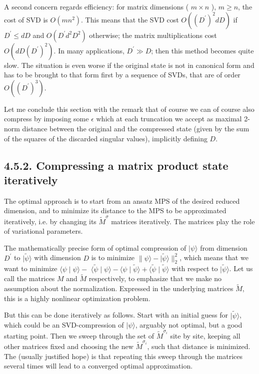 \documentclass[12pt]{article}
\begin{document}
A second concern regards efficiency: for matrix dimensions ( $m \times n$ ), $m \geq n$, the cost of SVD is $O\left(m n^{2}\right)$. This means that the SVD cost $O\left(\left(D^{\prime}\right)^{2} d D\right)$ if $D^{\prime} \leq d D$ and $O\left(D^{\prime} d^{2} D^{2}\right)$ otherwise; the matrix multiplications cost $O\left(d D\left(D^{\prime}\right)^{2}\right)$. In many applications, $D^{\prime} \gg D$; then this method becomes quite slow. The situation is even worse if the original state is not in canonical form and has to be brought to that form first by a sequence of SVDs, that are of order $O\left(\left(D^{\prime}\right)^{3}\right)$.

Let me conclude this section with the remark that of course we can of course also compress by imposing some $\epsilon$ which at each truncation we accept as maximal 2-norm distance between the original and the compressed state (given by the sum of the squares of the discarded singular values), implicitly defining $D$.

\subsection*{4.5.2. Compressing a matrix product state iteratively}
The optimal approach is to start from an ansatz MPS of the desired reduced dimension, and to minimize its distance to the MPS to be approximated iteratively, i.e. by changing its $\tilde{M}^{\sigma}$ matrices iteratively. The matrices play the role of variational parameters.

The mathematically precise form of optimal compression of $|\psi\rangle$ from dimension $D^{\prime}$ to $|\tilde{\psi}\rangle$ with dimension $D$ is to minimize $\| \psi\rangle-|\tilde{\psi}\rangle \|_{2}^{2}$, which means that we want to minimize $\langle\psi \mid \psi\rangle-$ $\langle\tilde{\psi} \mid \psi\rangle-\langle\psi \mid \tilde{\psi}\rangle+\langle\tilde{\psi} \mid \tilde{\psi}\rangle$ with respect to $|\tilde{\psi}\rangle$. Let us call the matrices $M$ and $\tilde{M}$ respectively, to emphasize that we make no assumption about the normalization. Expressed in the underlying matrices $\tilde{M}$, this is a highly nonlinear optimization problem.

But this can be done iteratively as follows. Start with an initial guess for $|\tilde{\psi}\rangle$, which could be an SVD-compression of $|\psi\rangle$, arguably not optimal, but a good starting point. Then we sweep through the set of $\tilde{M}^{\sigma_{i}}$ site by site, keeping all other matrices fixed and choosing the new $\tilde{M}^{\sigma_{i}}$, such that distance is minimized. The (usually justified hope) is that repeating this sweep through the matrices several times will lead to a converged optimal approximation.
\end{document}
